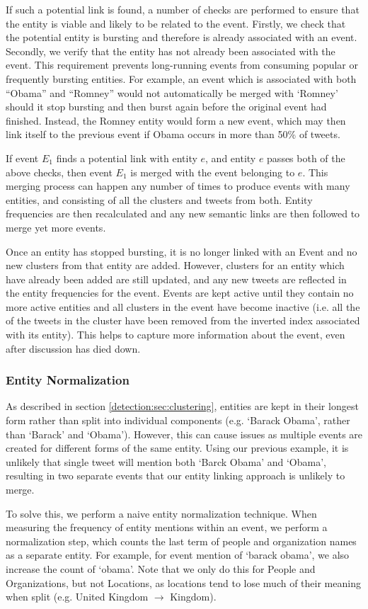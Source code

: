 If such a potential link is found, a number of checks are performed to ensure that the entity is viable and likely to be related to the event. Firstly, we check that the potential entity is bursting and therefore is already associated with an event. Secondly, we verify that the entity has not already been associated with the event. This requirement prevents long-running events from consuming popular or frequently bursting entities. For example, an event which is associated with both ``Obama'' and ``Romney'' would not automatically be merged with `Romney' should it stop bursting and then burst again before the original event had finished. Instead, the Romney entity would form a new event, which may then link itself to the previous event if Obama occurs in more than 50\% of tweets.

If event $E_{1}$ finds a potential link with entity $e$, and entity $e$ passes both of the above checks, then event $E_1$ is merged with the event belonging to $e$. This merging process can happen any number of times to produce events with many entities, and consisting of all the clusters and tweets from both.
Entity frequencies are then recalculated and any new semantic links are then followed to merge yet more events.

Once an entity has stopped bursting, it is no longer linked with an Event and no new clusters from that entity are added.
However, clusters for an entity which have already been added are still updated, and any new tweets are reflected in the entity frequencies for the event.
Events are kept active until they contain no more active entities and all clusters in the event have become inactive (i.e. all the of the tweets in the cluster have been removed from the inverted index associated with its entity).
This helps to capture more information about the event, even after discussion has died down.

\subsubsection{Entity Normalization}
\label{sec:entityNorm}
As described in section \ref{detection:sec:clustering}, entities are kept in their longest form rather than split into individual components (e.g. `Barack Obama', rather than `Barack' and `Obama').
However, this can cause issues as multiple events are created for different forms of the same entity.
Using our previous example, it is unlikely that single tweet will mention both `Barck Obama' and `Obama', resulting in two separate events that our entity linking approach is unlikely to merge.

To solve this, we perform a naive entity normalization technique.
When measuring the frequency of entity mentions within an event, we perform a normalization step, which counts the last term of people and organization names as a separate entity.
For example, for event mention of `barack obama', we also increase the count of `obama'.
Note that we only do this for People and Organizations, but not Locations, as locations tend to lose much of their meaning when split (e.g. United Kingdom $\rightarrow$ Kingdom).
